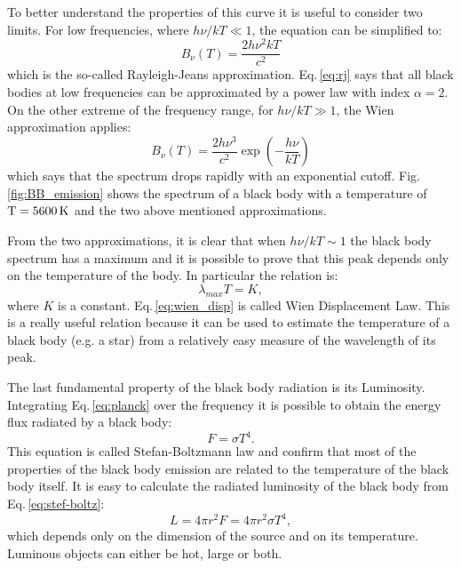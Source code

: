 \documentclass[../main.tex]{subfiles}
\begin{document}
To better understand the properties of this curve it is useful to consider two limits.
For low frequencies, where $h\nu/kT \ll 1$, the equation can be simplified to:
\begin{equation}
    \label{eq:rj}
    B_{\nu}(T) = \frac{2h\nu^2kT}{c^2}
\end{equation}
which is the so-called Rayleigh-Jeans approximation.
Eq.\,\ref{eq:rj} says that all black bodies at low frequencies can be approximated by a power law with index $\alpha = 2$.
On the other extreme of the frequency range, for $h\nu/kT \gg 1$, the Wien approximation applies:
\begin{equation}
    \label{eq:wien}
    B_{\nu}(T) = \frac{2h\nu^3}{c^2}\exp\left(-\frac{h\nu}{kT}\right)
\end{equation}
which says that the spectrum drops rapidly with an exponential cutoff.
Fig.\,\ref{fig:BB_emission} shows the spectrum of a black body with a temperature of $\rm T=5600\,\si{K}$ and the two above mentioned approximations.

From the two approximations, it is clear that when $h\nu/kT \sim 1$ the black body spectrum has a maximum and it is possible to prove that this peak depends only on the temperature of the body.
In particular the relation is:
\begin{equation}
    \label{eq:wien_disp}
    \lambda_{max}T=K,
\end{equation}
where $K$ is a constant.
Eq.\,\ref{eq:wien_disp} is called Wien Displacement Law.
This is a really useful relation because it can be used to estimate the temperature of a black body (e.g. a star) from a relatively easy measure of the wavelength of its peak.

The last fundamental property of the black body radiation is its Luminosity.
Integrating Eq.\,\ref{eq:planck} over the frequency it is possible to obtain the energy flux radiated by a black body:
\begin{equation}
    \label{eq:stef-boltz}
    F = \sigma T^4.
\end{equation}
This equation is called Stefan-Boltzmann law and confirm that most of the properties of the black body emission are related to the temperature of the black body itself.
It is easy to calculate the radiated luminosity of the black body from Eq.\,\ref{eq:stef-boltz}:
\begin{equation}
    \label{eq:luminosity}
    L = 4\pi r^2 F = 4\pi r^2\sigma T^4,
\end{equation}
which depends only on the dimension of the source and on its temperature.
Luminous objects can either be hot, large or both.
\end{document}
